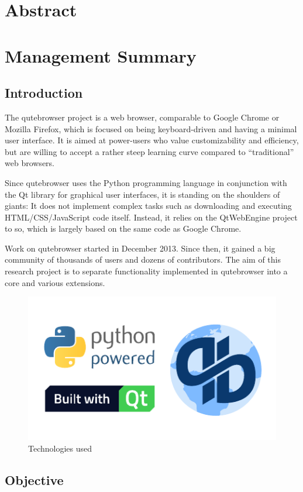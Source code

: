 
\chapter*{Abstract}
\fixme{}

\chapter*{Management Summary}
\section*{Introduction}
The qutebrowser project is a web browser, comparable to Google Chrome or Mozilla
Firefox, which is focused on being keyboard-driven and having a minimal user
interface. It is aimed at power-users who value customizability and efficiency,
but are willing to accept a rather steep learning curve compared to
``traditional'' web browsers.

Since qutebrowser uses the Python programming language in conjunction with the
Qt library for graphical user interfaces, it is standing on the shoulders of
giants: It does not implement complex tasks such as downloading and executing
HTML/CSS/JavaScript code itself. Instead, it relies on the QtWebEngine project
to so, which is largely based on the same code as Google Chrome.

Work on qutebrowser started in December 2013. Since then, it gained a big
community of thousands of users and dozens of contributors. The aim of this
research project is to separate functionality implemented in qutebrowser into a
core and various extensions.

\begin{figure}[H]
  \centering
  \includegraphics[width=0.7\linewidth]{img/logos.pdf}
  \caption{Technologies used}
\end{figure}

\section*{Objective}


